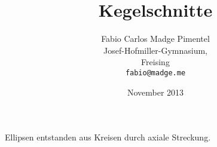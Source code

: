 \documentclass[12pt, a4paper, draft]{report}
\title{Kegelschnitte}
\author{Fabio Carlos Madge Pimentel\\
  Josef-Hofmiller-Gymnasium,\\
  Freising\\
  \texttt{fabio@madge.me}}
\date{November 2013}
\begin{document}


\tableofcontents
\newpage

Ellipsen entstanden aus Kreisen durch axiale Streckung. ~\cite{Pensel:1993uq}




\newpage

\end{document}
